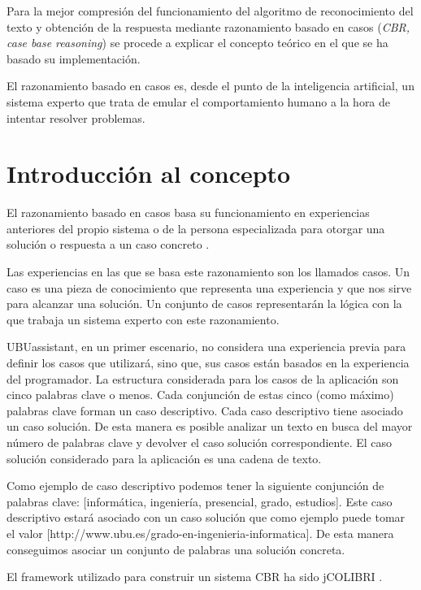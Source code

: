 
Para la mejor compresión del funcionamiento del algoritmo de reconocimiento del texto y obtención de la respuesta mediante razonamiento basado en casos (\emph{CBR, case base reasoning}) se procede a explicar el concepto teórico en el que se ha basado su implementación.

El razonamiento basado en casos es, desde el punto de la inteligencia artificial, un sistema experto que trata de emular el comportamiento humano a la hora de intentar resolver problemas.

\section{Introducción al concepto}\label{intro-concepto}

El razonamiento basado en casos basa su funcionamiento en experiencias anteriores del propio sistema o de la persona especializada para otorgar una solución o respuesta a un caso concreto \cite{wiki:cbr}.

Las experiencias en las que se basa este razonamiento son los llamados casos. Un caso es una pieza de conocimiento que representa una experiencia y que nos sirve para alcanzar una solución. Un conjunto de casos representarán la lógica con la que trabaja un sistema experto con este razonamiento.

UBUassistant, en un primer escenario, no considera una experiencia previa para definir los casos que utilizará, sino que, sus casos están basados en la experiencia del programador.
La estructura considerada para los casos de la aplicación son cinco palabras clave o menos. Cada conjunción de estas cinco (como máximo) palabras clave forman un caso descriptivo. Cada caso descriptivo tiene asociado un caso solución. De esta manera es posible analizar un texto en busca del mayor número de palabras clave y devolver el caso solución correspondiente. El caso solución considerado para la aplicación es una cadena de texto.

Como ejemplo de caso descriptivo podemos tener la siguiente conjunción de palabras clave: [informática, ingeniería, presencial, grado, estudios]. Este caso descriptivo estará asociado con un caso solución que como ejemplo puede tomar el valor [http://www.ubu.es/grado-en-ingenieria-informatica]. De esta manera conseguimos asociar un conjunto de palabras una solución concreta.

El framework utilizado para construir un sistema CBR ha sido jCOLIBRI \cite{colibri:gen}.

